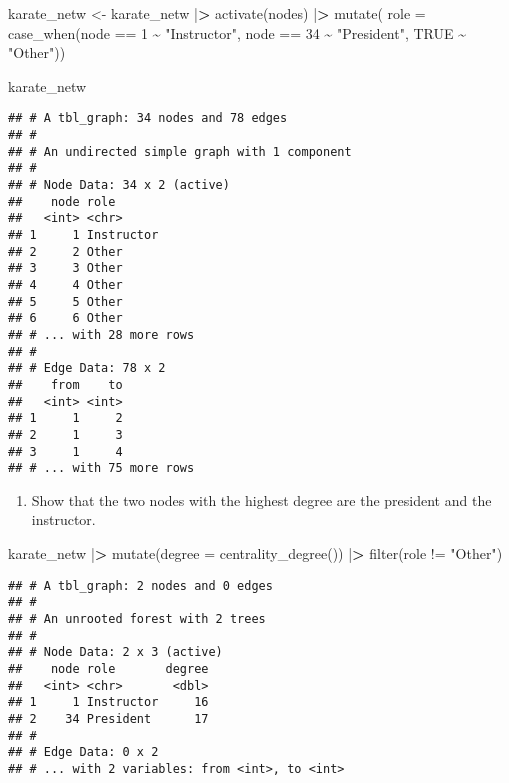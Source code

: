 \documentclass[
]{article}
\newenvironment{Shaded}{\begin{snugshade}}{\end{snugshade}}
\newcommand{\AttributeTok}[1]{\textcolor[rgb]{0.77,0.63,0.00}{#1}}
\newcommand{\ConstantTok}[1]{\textcolor[rgb]{0.00,0.00,0.00}{#1}}
\newcommand{\DecValTok}[1]{\textcolor[rgb]{0.00,0.00,0.81}{#1}}
\newcommand{\ErrorTok}[1]{\textcolor[rgb]{0.64,0.00,0.00}{\textbf{#1}}}
\newcommand{\FunctionTok}[1]{\textcolor[rgb]{0.00,0.00,0.00}{#1}}
\newcommand{\NormalTok}[1]{#1}
\newcommand{\OtherTok}[1]{\textcolor[rgb]{0.56,0.35,0.01}{#1}}
\newcommand{\SpecialCharTok}[1]{\textcolor[rgb]{0.00,0.00,0.00}{#1}}
\newcommand{\StringTok}[1]{\textcolor[rgb]{0.31,0.60,0.02}{#1}}
\providecommand{\tightlist}{%
  \setlength{\itemsep}{0pt}\setlength{\parskip}{0pt}}
\begin{document}
\begin{Shaded}
\begin{Highlighting}[]
\NormalTok{karate\_netw }\OtherTok{\textless{}{-}}\NormalTok{ karate\_netw }\SpecialCharTok{|}\ErrorTok{\textgreater{}}
  \FunctionTok{activate}\NormalTok{(nodes) }\SpecialCharTok{|}\ErrorTok{\textgreater{}}
  \FunctionTok{mutate}\NormalTok{(}
    \AttributeTok{role =} \FunctionTok{case\_when}\NormalTok{(node }\SpecialCharTok{==} \DecValTok{1} \SpecialCharTok{\textasciitilde{}} \StringTok{"Instructor"}\NormalTok{,}
\NormalTok{                     node }\SpecialCharTok{==} \DecValTok{34} \SpecialCharTok{\textasciitilde{}} \StringTok{"President"}\NormalTok{,}
                     \ConstantTok{TRUE} \SpecialCharTok{\textasciitilde{}} \StringTok{"Other"}\NormalTok{))}

\NormalTok{karate\_netw}
\end{Highlighting}
\end{Shaded}

\begin{verbatim}
## # A tbl_graph: 34 nodes and 78 edges
## #
## # An undirected simple graph with 1 component
## #
## # Node Data: 34 x 2 (active)
##    node role      
##   <int> <chr>     
## 1     1 Instructor
## 2     2 Other     
## 3     3 Other     
## 4     4 Other     
## 5     5 Other     
## 6     6 Other     
## # ... with 28 more rows
## #
## # Edge Data: 78 x 2
##    from    to
##   <int> <int>
## 1     1     2
## 2     1     3
## 3     1     4
## # ... with 75 more rows
\end{verbatim}

\begin{enumerate}
\def\labelenumi{(\arabic{enumi})}
\setcounter{enumi}{4}
\tightlist
\item
  Show that the two nodes with the highest degree are the president and
  the instructor.
\end{enumerate}

\begin{Shaded}
\begin{Highlighting}[]
\NormalTok{  karate\_netw }\SpecialCharTok{|}\ErrorTok{\textgreater{}}
  \FunctionTok{mutate}\NormalTok{(}\AttributeTok{degree =} \FunctionTok{centrality\_degree}\NormalTok{()) }\SpecialCharTok{|}\ErrorTok{\textgreater{}}
  \FunctionTok{filter}\NormalTok{(role }\SpecialCharTok{!=} \StringTok{"Other"}\NormalTok{)}
\end{Highlighting}
\end{Shaded}

\begin{verbatim}
## # A tbl_graph: 2 nodes and 0 edges
## #
## # An unrooted forest with 2 trees
## #
## # Node Data: 2 x 3 (active)
##    node role       degree
##   <int> <chr>       <dbl>
## 1     1 Instructor     16
## 2    34 President      17
## #
## # Edge Data: 0 x 2
## # ... with 2 variables: from <int>, to <int>
\end{verbatim}
\end{document}
